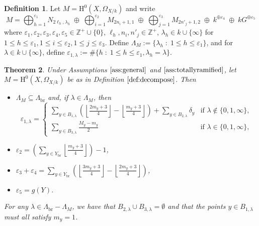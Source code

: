 \documentclass{amsart}
\numberwithin{equation}{section}
\numberwithin{table}{section}
\theoremstyle{plain}
\newtheorem{theorem}{Theorem}[section]
\theoremstyle{definition}
\newtheorem{definition}[theorem]{Definition}
\theoremstyle{remark}
\newcommand{\HH}{\mathrm{H}}
\begin{document}
\begin{definition}
\label{def:decompose}
Let $M=\HH^0(X,\Omega_{X/k})$ and write
$$M=\bigoplus_{h=1}^{\varepsilon_1} N_{2\ell_h,\lambda_h} \;\oplus\; \bigoplus_{i=1}^{\varepsilon_2} M_{2n_i+1,1} \;\oplus\;  \bigoplus_{j=1}^{\varepsilon_3} M_{2n'_j+1,2} \;\oplus\; k^{\oplus \varepsilon_4} \;\oplus\; kG^{\oplus \varepsilon_5}$$
where $\varepsilon_1,\varepsilon_2,\varepsilon_3,\varepsilon_4,\varepsilon_5\in \mathbb{Z}^+\cup\{0\}$, $\ell_h,n_i,n'_j\in \mathbb{Z}^+$, $\lambda_h\in k\cup\{\infty\}$ for $1\le h\le \varepsilon_1, 1\le i\le \varepsilon_2, 1\le j \le \varepsilon_3$. Define $\Lambda_M:=\{\lambda_h\;:\; 1\le h\le \varepsilon_1\}$, and for $\lambda\in k\cup\{\infty\}$, define $\varepsilon_{1,\lambda}:=\#\{h \; :\; 1\le h \le \varepsilon_1, \lambda_h=\lambda\}$.
\end{definition}


\begin{theorem}
\label{thm:mostgeneral}
Under Assumptions $\ref{ass:general}$ and $\ref{ass:totallyramified}$,  let $M=\HH^0(X,\Omega_{X/k})$ be as in Definition $\ref{def:decompose}$. 
Then
\begin{itemize}
\item[(i)] $\Lambda_M \subseteq \Lambda_{\mathrm{br}}$ and, if $\lambda\in \Lambda_M$, then 
$$\varepsilon_{1,\lambda} = 
\left\{\begin{array}{ll}
\sum_{y\in B_{1,\lambda}}\left(\left\lfloor \frac{2m_y+3}{4}\right\rfloor - \left\lfloor \frac{m_y+3}{4}\right\rfloor \right) + \sum_{y\in B_{2,\lambda}}\delta_y & \mbox{if } \lambda\not\in\{0,1,\infty\},\\[1ex]
\sum_{y\in B_{3,\lambda}} \frac{M_y-m_y}{2} & \mbox{if } \lambda\in\{0,1,\infty\},
\end{array}\right.$$
\item[(ii)] $\varepsilon_2= \displaystyle\left(\sum_{y\in Y_{\mathrm{br}}} \left\lfloor \frac{m_y+3}{4}\right\rfloor\right)-1$,
\item[(iii)] $\varepsilon_3+\varepsilon_4 = \displaystyle \sum_{y\in Y_{\mathrm{br}}} \left(\left\lfloor \frac{3m_y+3}{4}\right\rfloor - \left\lfloor \frac{2m_y+3}{4}\right\rfloor\right)$,
\item[(iv)] $\varepsilon_5=g(Y)$.
\end{itemize}
For any $\lambda\in\Lambda_{\mathrm{br}}-\Lambda_M$, we have that
$B_{2,\lambda}\cup B_{3,\lambda}=\emptyset$ and that the points 
$y\in B_{1,\lambda}$
must all satisfy $m_y=1$. 
\end{theorem}
\end{document}

